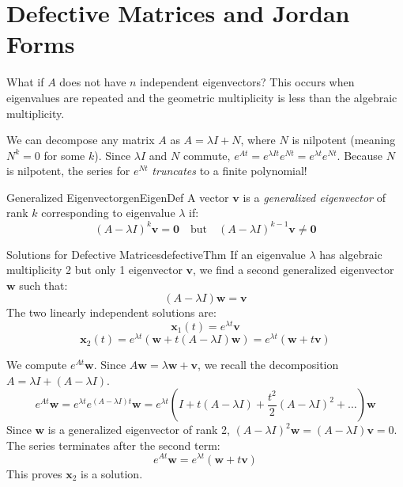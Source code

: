 \documentclass{book}
\newenvironment{Proof}[1][]
  {\begin{ProofTcb}[#1]}
  {\end{ProofTcb}}
\begin{document}
\section{Defective Matrices and Jordan Forms}

What if $A$ does not have $n$ independent eigenvectors? This occurs when eigenvalues are repeated and the geometric multiplicity is less than the algebraic multiplicity.

We can decompose any matrix $A$ as $A = \lambda I + N$, where $N$ is nilpotent (meaning $N^k = 0$ for some $k$). Since $\lambda I$ and $N$ commute, $e^{At} = e^{\lambda I t}e^{Nt} = e^{\lambda t} e^{Nt}$. Because $N$ is nilpotent, the series for $e^{Nt}$ \emph{truncates} to a finite polynomial!

\begin{defn}{Generalized Eigenvector}{genEigenDef}
    A vector $\mathbf{v}$ is a \emph{generalized eigenvector} of rank $k$ corresponding to eigenvalue $\lambda$ if:
    \[
        (A - \lambda I)^k \mathbf{v} = \mathbf{0} \quad \text{but} \quad (A - \lambda I)^{k-1} \mathbf{v} \ne \mathbf{0}
    \]
\end{defn}

\begin{thm}{Solutions for Defective Matrices}{defectiveThm}
    If an eigenvalue $\lambda$ has algebraic multiplicity 2 but only 1 eigenvector $\mathbf{v}$, we find a second generalized eigenvector $\mathbf{w}$ such that:
    \[
        (A - \lambda I)\mathbf{w} = \mathbf{v}
    \]
    The two linearly independent solutions are:
    \[
        \mathbf{x}_1(t) = e^{\lambda t}\mathbf{v}
    \]
    \[
        \mathbf{x}_2(t) = e^{\lambda t}(\mathbf{w} + t(A-\lambda I)\mathbf{w}) = e^{\lambda t}(\mathbf{w} + t\mathbf{v})
    \]
\end{thm}

\begin{Proof}
    We compute $e^{At}\mathbf{w}$. Since $A\mathbf{w} = \lambda \mathbf{w} + \mathbf{v}$, we recall the decomposition $A = \lambda I + (A - \lambda I)$.
    \[
        e^{At}\mathbf{w} = e^{\lambda t} e^{(A - \lambda I)t} \mathbf{w} = e^{\lambda t} \left( I + t(A - \lambda I) + \frac{t^2}{2}(A-\lambda I)^2 + \dots \right) \mathbf{w}
    \]
    Since $\mathbf{w}$ is a generalized eigenvector of rank 2, $(A-\lambda I)^2 \mathbf{w} = (A-\lambda I)\mathbf{v} = 0$. The series terminates after the second term:
    \[
        e^{At}\mathbf{w} = e^{\lambda t}(\mathbf{w} + t\mathbf{v})
    \]
    This proves $\mathbf{x}_2$ is a solution.
\end{Proof}
\end{document}
